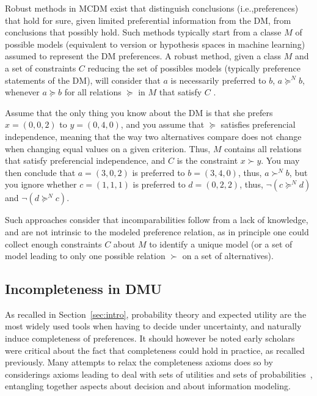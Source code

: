 \documentclass[french, english]{llncs}
\begin{document}
	Robust methods in MCDM exist that distinguish conclusions (i.e.,preferences) that hold for sure, given limited preferential information from the \ac{DM}, from conclusions that possibly hold. Such methods typically start from a classe $M$ of possible models (equivalent to version or hypothesis spaces in machine learning) assumed to represent the \ac{DM} preferences. A robust method, given a class $M$ and a set of constraints $C$ reducing the set of possibles models (typically preference statements of the \ac{DM}), will consider that $a$ is necessarily preferred to $b$, $a \succeq^N b$, whenever $a \succeq b$ for all relations $\succeq$ in $M$ that satisfy $C$ \citep{greco_ordinal_2008}.
	\begin{example} Assume that the only thing you know about the \ac{DM} is that she prefers $x = (0, 0, 2)$ to $y = (0, 4, 0)$, and you assume that $\succeq$ satisfies preferencial independence, meaning that the way two alternatives compare does not change when changing equal values on a given criterion. Thus, $M$ contains all relations that satisfy preferencial independence, and $C$ is the constraint $x \succ y$. You may then conclude that $a = (3, 0, 2)$ is preferred to $b = (3, 4, 0)$, thus, $a \succ^N b$, but you ignore whether $c = (1, 1, 1)$ is preferred to $d = (0, 2, 2)$, thus, $¬(c \succeq^N d)$ and $¬(d \succeq^N c)$.
	\end{example} 
Such approaches consider that incomparabilities follow from a lack of knowledge, and are not intrinsic to the modeled preference relation, as in principle one could collect enough constraints $C$ about $M$ to identify a unique model (or a set of model leading to only one possible relation $\succ$ on a set of alternatives).
	
	\subsection{Incompleteness in DMU}
	
	As recalled in Section~\ref{sec:intro}, probability theory and expected utility are the most widely used tools when having to decide under uncertainty, and naturally induce completeness of preferences. It should however be noted early scholars were critical about the fact that completeness could hold in practice, as recalled previously. Many attempts to relax the completeness axioms does so by considerings axioms leading to deal with sets of utilities and sets of probabilities~\cite{aumann_utility_1962}, entangling together aspects about decision and about information modeling. 
	
\end{document}
